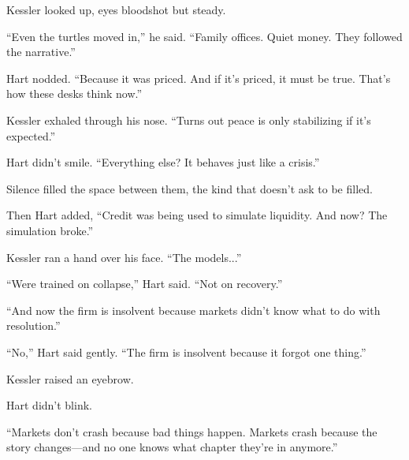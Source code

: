 Kessler looked up, eyes bloodshot but steady.

“Even the turtles moved in,” he said. “Family offices. Quiet money. They followed the narrative.”

Hart nodded. “Because it was priced. And if it’s priced, it must be true. That’s how these desks think now.”

Kessler exhaled through his nose. “Turns out peace is only stabilizing if it's expected.”

Hart didn’t smile. “Everything else? It behaves just like a crisis.”

Silence filled the space between them, the kind that doesn’t ask to be filled.

Then Hart added, “Credit was being used to simulate liquidity. And now? The simulation broke.”

Kessler ran a hand over his face. “The models...”

“Were trained on collapse,” Hart said. “Not on recovery.”

“And now the firm is insolvent because markets didn’t know what to do with resolution.”

“No,” Hart said gently. “The firm is insolvent because it forgot one thing.”

Kessler raised an eyebrow.

Hart didn’t blink.

“Markets don’t crash because bad things happen. Markets crash because the story changes—and no one knows what chapter they’re in anymore.”
